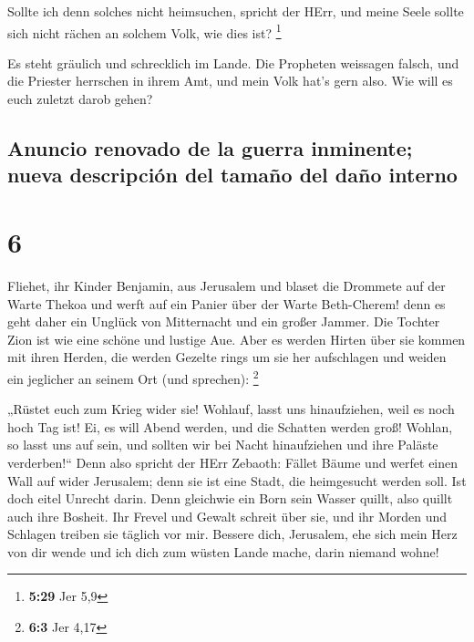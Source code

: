  Sollte ich denn solches nicht heimsuchen, spricht der
HErr, und meine Seele sollte sich nicht rächen an solchem Volk, wie dies
ist? \footnote{\textbf{5:29} Jer 5,9}

 Es steht gräulich und schrecklich im Lande.
 Die Propheten weissagen falsch, und die Priester
herrschen in ihrem Amt, und mein Volk hat's gern also. Wie will es euch
zuletzt darob gehen?

\hypertarget{anuncio-renovado-de-la-guerra-inminente-nueva-descripciuxf3n-del-tamauxf1o-del-dauxf1o-interno}{%
\subsection{Anuncio renovado de la guerra inminente; nueva descripción
del tamaño del daño
interno}\label{anuncio-renovado-de-la-guerra-inminente-nueva-descripciuxf3n-del-tamauxf1o-del-dauxf1o-interno}}

\hypertarget{section-5}{%
\section{6}\label{section-5}}

 Fliehet, ihr Kinder Benjamin, aus Jerusalem und blaset
die Drommete auf der Warte Thekoa und werft auf ein Panier über der
Warte Beth-Cherem! denn es geht daher ein Unglück von Mitternacht und
ein großer Jammer.  Die Tochter Zion ist wie eine schöne
und lustige Aue.  Aber es werden Hirten über sie kommen
mit ihren Herden, die werden Gezelte rings um sie her aufschlagen und
weiden ein jeglicher an seinem Ort (und sprechen): \footnote{\textbf{6:3}
  Jer 4,17}

 „Rüstet euch zum Krieg wider sie! Wohlauf, lasst uns
hinaufziehen, weil es noch hoch Tag ist! Ei, es will Abend werden, und
die Schatten werden groß!  Wohlan, so lasst uns auf sein,
und sollten wir bei Nacht hinaufziehen und ihre Paläste verderben!{}``
 Denn also spricht der HErr Zebaoth: Fället Bäume und
werfet einen Wall auf wider Jerusalem; denn sie ist eine Stadt, die
heimgesucht werden soll. Ist doch eitel Unrecht darin. 
Denn gleichwie ein Born sein Wasser quillt, also quillt auch ihre
Bosheit. Ihr Frevel und Gewalt schreit über sie, und ihr Morden und
Schlagen treiben sie täglich vor mir.  Bessere dich,
Jerusalem, ehe sich mein Herz von dir wende und ich dich zum wüsten
Lande mache, darin niemand wohne!


